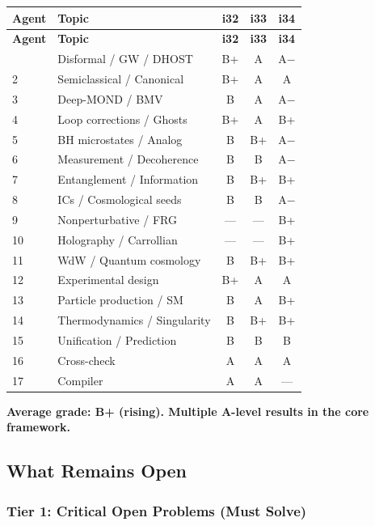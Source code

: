 \documentclass[11pt,a4paper]{article}
\begin{document}
\begin{center}
\begin{longtable}{lp{5cm}ccc}
\toprule
\textbf{Agent} & \textbf{Topic} & \textbf{i32} & \textbf{i33} & \textbf{i34} \\
\midrule
\endfirsthead
\toprule
\textbf{Agent} & \textbf{Topic} & \textbf{i32} & \textbf{i33} & \textbf{i34} \\
\midrule
\endhead
\bottomrule
\endlastfoot
1 & Disformal / GW / DHOST & B+ & A & A$-$ \\
2 & Semiclassical / Canonical & B+ & A & A \\
3 & Deep-MOND / BMV & B & A & A$-$ \\
4 & Loop corrections / Ghosts & B+ & A & B+ \\
5 & BH microstates / Analog & B & B+ & A$-$ \\
6 & Measurement / Decoherence & B & B & A$-$ \\
7 & Entanglement / Information & B & B+ & B+ \\
8 & ICs / Cosmological seeds & B & B & A$-$ \\
9 & Nonperturbative / FRG & --- & --- & B+ \\
10 & Holography / Carrollian & --- & --- & B+ \\
11 & WdW / Quantum cosmology & B & B+ & B+ \\
12 & Experimental design & B+ & A & A \\
13 & Particle production / SM & B & A & B+ \\
14 & Thermodynamics / Singularity & B & B+ & B+ \\
15 & Unification / Prediction & B & B & B \\
16 & Cross-check & A & A & A \\
17 & Compiler & A & A & --- \\
\end{longtable}
\end{center}

\textbf{Average grade: B+ (rising). Multiple A-level results in the core framework.}

\subsection{What Remains Open}

\subsubsection{Tier 1: Critical Open Problems (Must Solve)}
\end{document}
